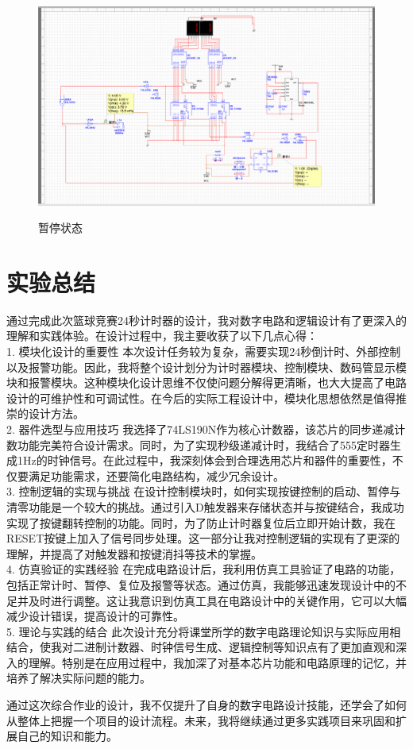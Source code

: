 \documentclass[12p,UTF8]{article}
\begin{document}
\begin{spacing}{1.25}
  \begin{figure}[H]
    \centering  %
    \label{电路图4}
    \includegraphics[width=1\textwidth]{4}
    \caption{暂停状态}
    \label{电路图4}
  \end{figure}

  


  \section{实验总结}
  通过完成此次篮球竞赛24秒计时器的设计，我对数字电路和逻辑设计有了更深入的理解和实践体验。在设计过程中，我主要收获了以下几点心得：\\
1.	模块化设计的重要性
本次设计任务较为复杂，需要实现24秒倒计时、外部控制以及报警功能。因此，我将整个设计划分为计时器模块、控制模块、数码管显示模块和报警模块。这种模块化设计思维不仅使问题分解得更清晰，也大大提高了电路设计的可维护性和可调试性。在今后的实际工程设计中，模块化思想依然是值得推崇的设计方法。
\\2.	器件选型与应用技巧
我选择了74LS190N作为核心计数器，该芯片的同步递减计数功能完美符合设计需求。同时，为了实现秒级递减计时，我结合了555定时器生成1Hz的时钟信号。在此过程中，我深刻体会到合理选用芯片和器件的重要性，不仅要满足功能需求，还要简化电路结构，减少冗余设计。
\\3.	控制逻辑的实现与挑战
在设计控制模块时，如何实现按键控制的启动、暂停与清零功能是一个较大的挑战。通过引入D触发器来存储状态并与按键结合，我成功实现了按键翻转控制的功能。同时，为了防止计时器复位后立即开始计数，我在RESET按键上加入了信号同步处理。这一部分让我对控制逻辑的实现有了更深的理解，并提高了对触发器和按键消抖等技术的掌握。
\\4.	仿真验证的实践经验
在完成电路设计后，我利用仿真工具验证了电路的功能，包括正常计时、暂停、复位及报警等状态。通过仿真，我能够迅速发现设计中的不足并及时进行调整。这让我意识到仿真工具在电路设计中的关键作用，它可以大幅减少设计错误，提高设计的可靠性。
\\5.	理论与实践的结合
此次设计充分将课堂所学的数字电路理论知识与实际应用相结合，使我对二进制计数器、时钟信号生成、逻辑控制等知识点有了更加直观和深入的理解。特别是在应用过程中，我加深了对基本芯片功能和电路原理的记忆，并培养了解决实际问题的能力。

通过这次综合作业的设计，我不仅提升了自身的数字电路设计技能，还学会了如何从整体上把握一个项目的设计流程。未来，我将继续通过更多实践项目来巩固和扩展自己的知识和能力。

\end{spacing}
\end{document}
